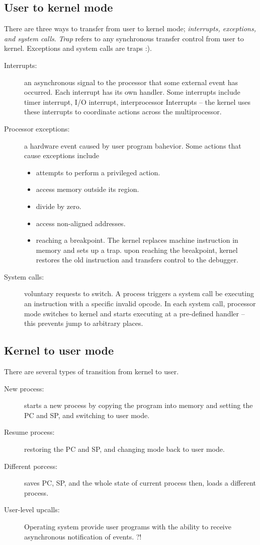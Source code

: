 \subsection{User to kernel mode}
There are three ways to transfer from user to kernel mode; \textit{interrupts, exceptions, and system calls}. \textit{Trap} refers to any synchronous transfer control from user to kernel. Exceptions and system calls are traps :). 

\begin{description}
    \item [Interrupts:] an asynchronous signal to the processor that some external event has occurred. Each interrupt has its own handler. Some interrupts include timer interrupt, I/O interrupt, interprocessor Interrupts -- the kernel uses these interrupts to coordinate actions across the multiprocessor.
    \item [Processor exceptions:] a hardware event caused by user program bahevior. Some actions that cause exceptions include 
    \begin{itemize}
        \item attempts to perform a privileged action.
        \item access memory outside its region.
        \item divide by zero.
        \item access non-aligned addresses.
        \item reaching a breakpoint. The kernel replaces machine instruction in memory and sets up a trap. upon reaching the breakpoint, kernel restores the old instruction and transfers control to the debugger.
    \end{itemize}
    \item[System calls:] voluntary requests to switch. A process triggers a system call be executing an instruction with a specific invalid opcode. In each system call, processor mode switches to kernel and starts executing at a pre-defined handler -- this prevents jump to arbitrary places.
\end{description}

\subsection{Kernel to user mode}
There are several types of transition from kernel to user.

\begin{description}
    \item[New process:] starts a new process by copying the program into memory and setting the PC and SP, and switching to user mode.
    \item[Resume process:]  restoring the PC and SP, and changing mode back to user mode.
    \item[Different porcess:] saves PC, SP, and the whole state of current process then, loads a different process.
    \item[User-level upcalls:] Operating system provide user programs with the ability to receive asynchronous notification of events. ?!
\end{description}

